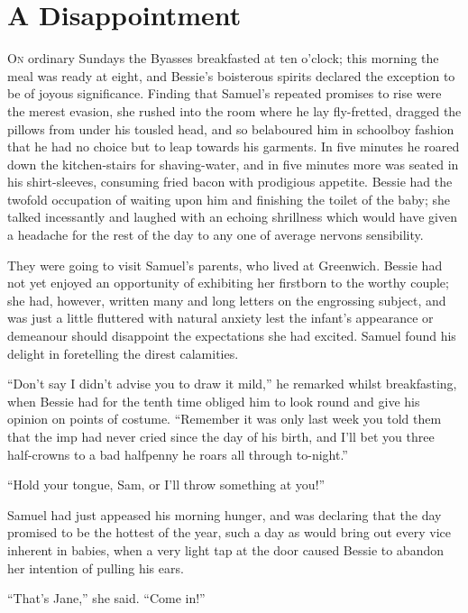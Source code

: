 \chapter{A Disappointment}

\textsc{On} ordinary Sundays the Byasses breakfasted at ten o'clock;
this morning the meal was ready at eight, and Bessie's boisterous
spirits declared the exception to be of joyous significance. Finding
that Samuel's repeated promises to rise were the merest evasion, she
rushed into the room where he lay fly-fretted, dragged the pillows from
under his tousled head, and so belaboured him in schoolboy fashion that
he had no choice but to leap towards his garments. In five minutes he
roared down the kitchen-stairs for shaving-water, and in five minutes
more was seated in his shirt-sleeves, consuming fried bacon with
prodigious appetite. Bessie had the twofold occupation of waiting upon
him and finishing the toilet of the baby; she talked
{\protect\hypertarget{235}{}{}}incessantly and laughed with an echoing
shrillness which would have given a headache for the rest of the day to
any one of average nervons sensibility.

They were going to visit Samuel's parents, who lived at Greenwich.
Bessie had not yet enjoyed an opportunity of exhibiting her firstborn to
the worthy couple; she had, however, written many and long letters on
the engrossing subject, and was just a little fluttered with natural
anxiety lest the infant's appearance or demeanour should disappoint the
expectations she had excited. Samuel found his delight in foretelling
the direst calamities.

``Don't say I didn't advise you to draw it mild,'' he remarked whilst
breakfasting, when Bessie had for the tenth time obliged him to look
round and give his opinion on points of costume. ``Remember it was only
last week you told them that the imp had never cried since the day of
his birth, and I'll bet you three half-crowns to a bad halfpenny he
roars all through to-night.''

{\protect\hypertarget{236}{}{}}``Hold your tongue, Sam, or I'll throw
something at you!''

Samuel had just appeased his morning hunger, and was declaring that the
day promised to be the hottest of the year, such a day as would bring
out every vice inherent in babies, when a very light tap at the door
caused Bessie to abandon her intention of pulling his ears.

``That's Jane,'' she said. ``Come in!''


